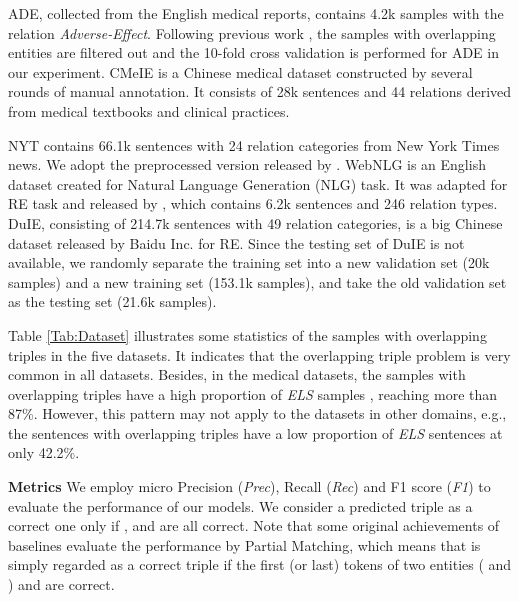 \documentclass[conference]{IEEEtran}
\begin{document}
ADE, collected from the English medical reports, contains 4.2k samples with the relation \emph{Adverse-Effect}. Following previous work \cite{Yan2021A}, the samples with overlapping entities are filtered out and the 10-fold cross validation is performed for ADE in our experiment. CMeIE is a Chinese medical dataset constructed by several rounds of manual annotation. It consists of 28k sentences and 44 relations derived from medical textbooks and clinical practices. 

NYT contains 66.1k sentences with 24 relation categories from New York Times news. We adopt the preprocessed version released by \cite{Zeng2018Extracting}. WebNLG is an English dataset created for Natural Language Generation (NLG) task. It was adapted for RE task and released by \cite{Zeng2018Extracting}, which contains 6.2k sentences and 246 relation types. DuIE, consisting of 214.7k sentences with 49 relation categories, is a big Chinese dataset released by Baidu Inc. for RE. Since the testing set of DuIE is not available, we randomly separate the training set into a new validation set (20k samples) and a new training set (153.1k samples), and take the old validation set as the testing set (21.6k samples).


Table \ref{Tab:Dataset} illustrates some statistics of the samples with overlapping triples in the five datasets. It indicates that the overlapping triple problem is very common in all datasets. Besides, in the medical datasets, the samples with overlapping triples have a high proportion of \emph{ELS} samples , reaching more than 87\%. However, this pattern may not apply to the datasets in other domains, e.g., the sentences with overlapping triples have a low proportion of \emph{ELS} sentences at only 42.2\%.


\textbf{Metrics}
We employ micro Precision (\emph{Prec}), Recall (\emph{Rec}) and F1 score (\emph{F1}) to evaluate the performance of our models. We consider a predicted triple  as a correct one only if ,  and  are all correct. Note that some original achievements of baselines evaluate the performance by Partial Matching, which means that  is simply regarded as a correct triple if the first (or last) tokens of two entities ( and ) and  are correct.
\end{document}
